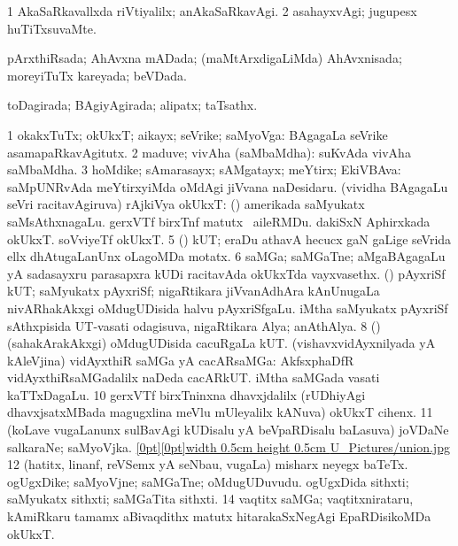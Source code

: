 {{\bentry
{} 
\gl{\kirxvi}
\expl{}
\bmng
\bnum
\num{1} AkaSaRkavallxda riVtiyalilx; anAkaSaRkavAgi. 
\num{2} asahayxvAgi; jugupesx huTiTxsuvaMte. 
\enum
\emng
\eentry

\bentry
{} 
\gl{\gu}
\expl{}
\bmng
pArxthiRsada; AhAvxna mADada; (maMtArxdigaLiMda) AhAvxnisada; moreyiTuTx kareyada; beVDada. 
\emng
\eentry

\bentry
{} 
\gl{\gu}
\expl{}
\bmng
toDagirada; BAgiyAgirada; alipatx; taTsathx. 
\emng
\eentry

\bentry
{} 
\gl{\nA}
\expl{}
\bmng
\bnum
\num{1} okakxTuTx; okUkxT; aikayx; seVrike; saMyoVga:  BAgagaLa seVrike asamapaRkavAgitutx. 
\num{2} maduve; vivAha (saMbaMdha):  suKvAda vivAha saMbaMdha. 
\num{3} hoMdike; sAmarasayx; sAMgatayx; meYtirx; EkiVBAva:  saMpUNRvAda meYtirxyiMda oMdAgi jiVvana naDesidaru. 
 (vividha BAgagaLu seVri racitavAgiruva) rAjkiVya okUkxT: 
\banum
{} (\kanmu) amerikada saMyukatx saMsAthxnagaLu. 
 gerxVTf birxTnf matutx \kanu\ aileRMDu. 
 dakiSxN Aphirxkada okUkxT. 
 soVviyeTf okUkxT. 
\eanum
\numie
\num{5} (\ga) kUT; eraDu athavA hecucx gaN  gaLige seVrida ellx dhAtugaLanUnx oLagoMDa motatx. 
\num{6} saMGa; saMGaTne; aMgaBAgagaLu yA sadasayxru parasapxra kUDi racitavAda okUkxTda vayxvasethx. 
\banum
{} (\ca) pAyxriSf kUT; saMyukatx pAyxriSf; nigaRtikara jiVvanAdhAra kAnUnugaLa nivARhakAkxgi oMdugUDisida halvu pAyxriSfgaLu. 
\hypertarget{union(7)b}{} 
 iMtha saMyukatx pAyxriSf sAthxpisida UT-vasati odagisuva, nigaRtikara Alya; anAthAlya. 
\eanum
\numie
\num{8} (\birx) (sahakArakAkxgi) oMdugUDisida cacuRgaLa kUT. 
\banum
{} (vishavxvidAyxnilyada yA kAleVjina) vidAyxthiR saMGa yA cacARsaMGa:  AkfsxphaDfR vidAyxthiRsaMGadalilx naDeda cacARkUT. 
 iMtha saMGada vasati kaTTxDagaLu. 
\eanum
\numie
\num{10} gerxVTf birxTninxna dhavxjdalilx (rUDhiyAgi dhavxjsatxMBada magugxlina meVlu mUleyalilx kANuva) okUkxT cihenx. 
\num{11} (koLave \mo vugaLanunx sulBavAgi kUDisalu yA beVpaRDisalu baLasuva) joVDaNe salkaraNe; saMyoVjka. \quad\hyperlink{unionfigure}{\raisebox{-0.15cm}[0pt][0pt]{\pdfimage width 0.5cm height 0.5cm {U_Pictures/union.jpg}}} 
\num{12} (hatitx, linanf, reVSemx yA seNbau, \mo vugaLa) misharx neyegx baTeTx. 
\banum
{} ogUgxDike; saMyoVjne; saMGaTne; oMdugUDuvudu. 
 ogUgxDida sithxti; saMyukatx sithxti; saMGaTita sithxti. 
\eanum
\numie
\num{14} vaqtitx saMGa; vaqtitxnirataru, kAmiRkaru tamamx aBivaqdithx matutx hitarakaSxNegAgi EpaRDisikoMDa okUkxT. 
\enum
\emng

}}
